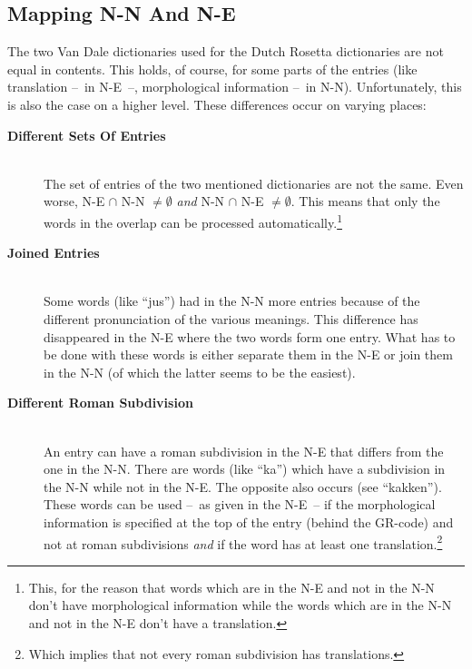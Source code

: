 \subsection{Mapping N-N And N-E}
The two Van Dale dictionaries used for the Dutch Rosetta dictionaries are not
equal in contents. This holds, of course, for some parts of the entries (like
translation --~in N-E~--, morphological information --~in N-N). Unfortunately, 
this is also the case on a higher level. These differences occur on varying 
places:

\begin{description}
  \item [{\bf Different Sets Of Entries}]\hspace{1cm}\\ 
        The set of entries of the two mentioned dictionaries are not the same.
        Even worse, N-E $\cap$ N-N $\neq \emptyset$ {\em and} N-N $\cap$ N-E 
        $\neq \emptyset$. This means that only the words in the overlap can be 
        processed automatically.\footnote{This, for the reason that words 
        which are in the N-E and not in the N-N don't have morphological 
        information while the words which are in the N-N and not in the N-E 
        don't have a translation.}
  \item [{\bf Joined Entries}]\hspace{1cm}\\
        Some words (like ``jus'') had in the N-N more entries because of the
        different pronunciation of the various meanings. This difference has
        disappeared in the N-E where the two words form one entry. What has to 
        be done with these words is either separate them in the N-E or join
        them in the N-N (of which the latter seems to be the easiest).
  \item [{\bf Different Roman Subdivision}]\hspace{1cm}\\
        An entry can have a roman subdivision in the N-E that differs from the 
        one in the N-N. There are words (like ``ka'') which have a subdivision 
        in the N-N while not in the N-E. The opposite also occurs (see 
        ``kakken''). These words can be used --~as given in the N-E~-- if the 
        morphological information is specified at the top of the entry (behind 
        the GR-code) and not at roman subdivisions {\em and} if the word has at 
        least one translation.\footnote{Which implies that not every roman 
        subdivision has translations.}

\end{description}
